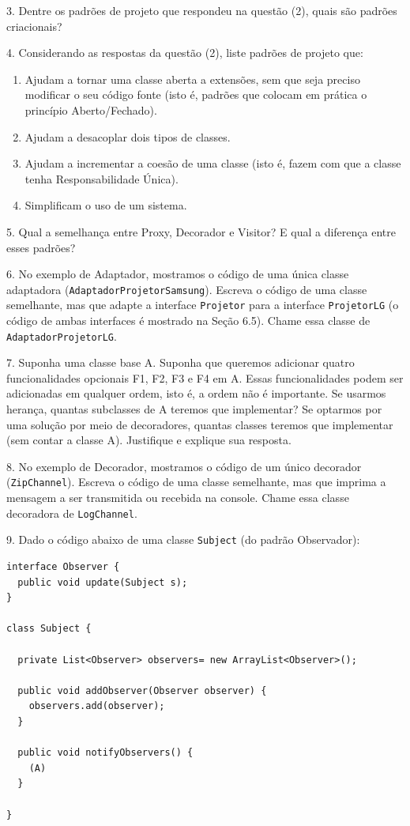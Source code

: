 \documentclass[
  11pt,
  twoside]{book}
\newcommand{\passthrough}[1]{#1}
\begin{document}
3. Dentre os padrões de projeto que respondeu na questão (2), quais são
padrões criacionais?

4. Considerando as respostas da questão (2), liste padrões de projeto
que:

\begin{enumerate}
\def\labelenumi{\alph{enumi})}
\item
  Ajudam a tornar uma classe aberta a extensões, sem que seja preciso
  modificar o seu código fonte (isto é, padrões que colocam em prática o
  princípio Aberto/Fechado).
\item
  Ajudam a desacoplar dois tipos de classes.
\item
  Ajudam a incrementar a coesão de uma classe (isto é, fazem com que a
  classe tenha Responsabilidade Única).
\item
  Simplificam o uso de um sistema.
\end{enumerate}

5. Qual a semelhança entre Proxy, Decorador e Visitor? E qual a
diferença entre esses padrões?

6. No exemplo de Adaptador, mostramos o código de uma única classe
adaptadora (\passthrough{\lstinline!AdaptadorProjetorSamsung!}). Escreva
o código de uma classe semelhante, mas que adapte a interface
\passthrough{\lstinline!Projetor!} para a interface
\passthrough{\lstinline!ProjetorLG!} (o código de ambas interfaces é
mostrado na Seção 6.5). Chame essa classe de
\passthrough{\lstinline!AdaptadorProjetorLG!}.

7. Suponha uma classe base A. Suponha que queremos adicionar quatro
funcionalidades opcionais F1, F2, F3 e F4 em A. Essas funcionalidades
podem ser adicionadas em qualquer ordem, isto é, a ordem não é
importante. Se usarmos herança, quantas subclasses de A teremos que
implementar? Se optarmos por uma solução por meio de decoradores,
quantas classes teremos que implementar (sem contar a classe A).
Justifique e explique sua resposta.

8. No exemplo de Decorador, mostramos o código de um único decorador
(\passthrough{\lstinline!ZipChannel!}). Escreva o código de uma classe
semelhante, mas que imprima a mensagem a ser transmitida ou recebida na
console. Chame essa classe decoradora de
\passthrough{\lstinline!LogChannel!}.

9. Dado o código abaixo de uma classe \passthrough{\lstinline!Subject!}
(do padrão Observador):

\begin{lstlisting}
interface Observer {
  public void update(Subject s);
}

class Subject {

  private List<Observer> observers= new ArrayList<Observer>();

  public void addObserver(Observer observer) {
    observers.add(observer);
  }

  public void notifyObservers() {
    (A)
  }

}
\end{lstlisting}
\end{document}

